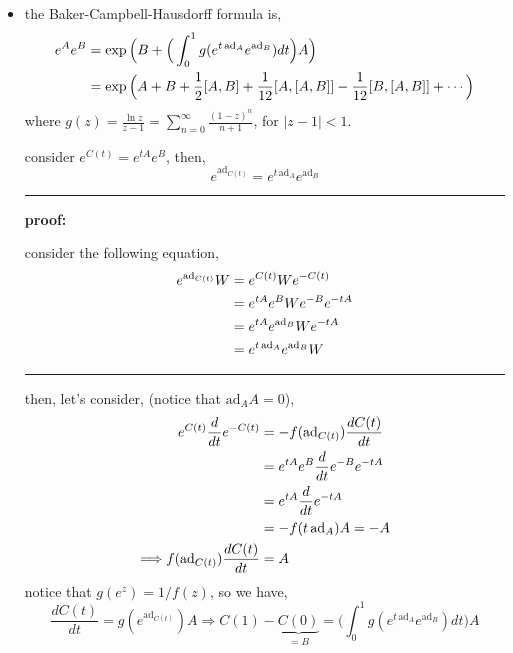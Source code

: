 \begin{itemize}
	\noindent\rule[0.5ex]{\linewidth}{0.5pt} %
	
	\item the Baker-Campbell-Hausdorff formula is,
	\begin{align}
		e^A e^B &= \exp \Big( B + \Big( \int_0^1 g(e^{t \, \mathrm{ad}_A} e^{\mathrm{ad}_B}) dt \Big) A \Big) \notag \\
		&= \exp \Big( A + B + \frac{1}{2} [A, B] + \frac{1}{12} [A, [A, B]] - \frac{1}{12} [B, [A, B]] + \cdots \Big)
	\end{align}
	where $g(z) = \frac{\ln z}{z - 1} = \sum_{n = 0}^\infty \frac{(1 - z)^n}{n + 1}$, for $|z - 1| < 1$.
	
	\begin{tcolorbox}[title=proof:]
		consider $e^{C(t)} = e^{t A} e^B$, then,
		\begin{equation}
			e^{\mathrm{ad}_{C(t)}} = e^{t \, \mathrm{ad}_A} e^{\mathrm{ad}_B}
		\end{equation}
		
		\noindent\rule[0.5ex]{\linewidth}{0.5pt} %
		
		\textbf{proof:}
		
		consider the following equation,
		\begin{align}
			e^{\mathrm{ad}_{C(t)}} W &= e^{C(t)} W e^{- C(t)} \notag \\
			&= e^{t A} e^B W e^{- B} e^{- t A} \notag \\
			&= e^{t A} e^{\mathrm{ad}_B} W e^{- t A} \notag \\
			&= e^{t \, \mathrm{ad}_A} e^{\mathrm{ad}_B} W
		\end{align}
		
		\noindent\rule[0.5ex]{\linewidth}{0.5pt} %
		
		then, let’s consider, (notice that $\mathrm{ad}_A A = 0$),
		\begin{align}
			e^{C(t)} \frac{d}{dt} e^{- C(t)} &= - f(\mathrm{ad}_{C(t)}) \frac{d C(t)}{dt} \notag \\
			&= e^{t A} e^B \frac{d}{dt} e^{- B} e^{- t A} \notag \\
			&= e^{t A} \frac{d}{dt} e^{- t A} \notag \\
			&= - f(t \, \mathrm{ad}_A) A = - A \\
			\Longrightarrow f(\mathrm{ad}_{C(t)}) \frac{d C(t)}{dt} &= A
		\end{align}
		notice that $g(e^z) = 1 / f(z)$, so we have,
		\begin{equation}
			\frac{d C(t)}{dt} = g(e^{\mathrm{ad}_{C(t)}}) A \Longrightarrow C(1) - \underbrace{C(0)}_{= B} = \Big( \int_0^1 g(e^{t \, \mathrm{ad}_A} e^{\mathrm{ad}_B}) dt \Big) A
		\end{equation}
	\end{tcolorbox}
\end{itemize}
